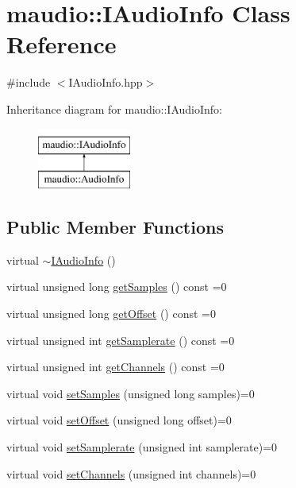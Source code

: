 \hypertarget{classmaudio_1_1IAudioInfo}{\section{maudio\-:\-:I\-Audio\-Info Class Reference}
\label{classmaudio_1_1IAudioInfo}
}


{\ttfamily \#include $<$I\-Audio\-Info.\-hpp$>$}

Inheritance diagram for maudio\-:\-:I\-Audio\-Info\-:\begin{figure}[H]
\begin{center}
\leavevmode
\includegraphics[height=2.000000cm]{classmaudio_1_1IAudioInfo}
\end{center}
\end{figure}
\subsection*{Public Member Functions}
\begin{DoxyCompactItemize}
\item 
virtual \hyperlink{classmaudio_1_1IAudioInfo_aff8c17f3657c997ee2ea0aadf31e989c}{$\sim$\-I\-Audio\-Info} ()
\item 
virtual unsigned long \hyperlink{classmaudio_1_1IAudioInfo_a88a698d7169f5c21118b83b8afcd1bf6}{get\-Samples} () const =0
\item 
virtual unsigned long \hyperlink{classmaudio_1_1IAudioInfo_ab85da546b049d23c400c8a869ea1e103}{get\-Offset} () const =0
\item 
virtual unsigned int \hyperlink{classmaudio_1_1IAudioInfo_a557f464eb6a2feb2ce24dfae5a85d727}{get\-Samplerate} () const =0
\item 
virtual unsigned int \hyperlink{classmaudio_1_1IAudioInfo_a5b412da4d44d7939b4927ec932c74a83}{get\-Channels} () const =0
\item 
virtual void \hyperlink{classmaudio_1_1IAudioInfo_ab2b4c49c21fa711f457650cc377271bb}{set\-Samples} (unsigned long samples)=0
\item 
virtual void \hyperlink{classmaudio_1_1IAudioInfo_a333fc60d8bf76b82bc0a65b8c6a77e4f}{set\-Offset} (unsigned long offset)=0
\item 
virtual void \hyperlink{classmaudio_1_1IAudioInfo_a2a54df3fc726ccb2b0994bc8e3d15c37}{set\-Samplerate} (unsigned int samplerate)=0
\item 
virtual void \hyperlink{classmaudio_1_1IAudioInfo_aaae3741d16b6c0dc531084876940a0f4}{set\-Channels} (unsigned int channels)=0
\end{DoxyCompactItemize}


